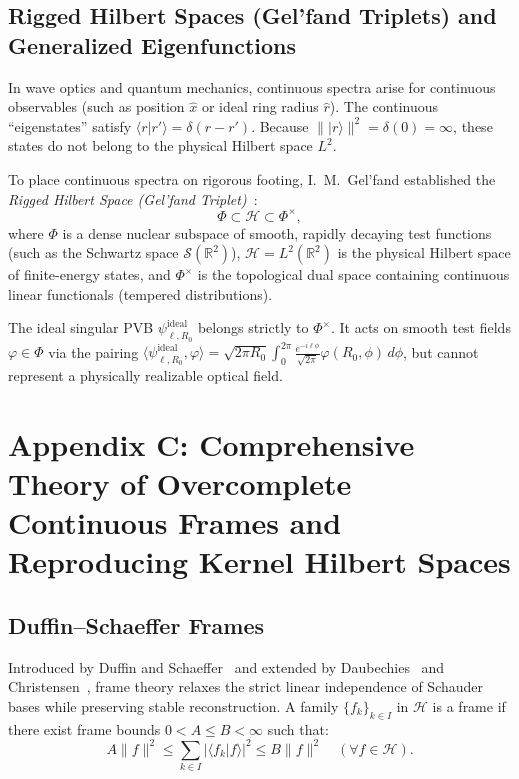 \documentclass[11pt,a4paper]{article}
\begin{document}
\subsection{Rigged Hilbert Spaces (Gel'fand Triplets) and Generalized Eigenfunctions}

In wave optics and quantum mechanics, continuous spectra arise for continuous observables (such as position $\hat{x}$ or ideal ring radius $\hat{r}$). The continuous ``eigenstates'' satisfy $\langle r | r' \rangle = \delta(r - r')$. Because $\||r\rangle\|^2 = \delta(0) = \infty$, these states do not belong to the physical Hilbert space $L^2$.

To place continuous spectra on rigorous footing, I.~M.~Gel'fand established the \emph{Rigged Hilbert Space (Gel'fand Triplet)}~\cite{Gelfand1964,Bohm1989}:
\begin{equation}
\Phi \subset \mathcal{H} \subset \Phi^\times,
\label{eq:app_gelfand_triplet}
\end{equation}
where $\Phi$ is a dense nuclear subspace of smooth, rapidly decaying test functions (such as the Schwartz space $\mathcal{S}(\mathbb{R}^2)$), $\mathcal{H} = L^2(\mathbb{R}^2)$ is the physical Hilbert space of finite-energy states, and $\Phi^\times$ is the topological dual space containing continuous linear functionals (tempered distributions).

The ideal singular PVB $\psi_{\ell, R_0}^{\text{ideal}}$ belongs strictly to $\Phi^\times$. It acts on smooth test fields $\varphi \in \Phi$ via the pairing $\langle \psi_{\ell, R_0}^{\text{ideal}}, \varphi \rangle = \sqrt{2\pi R_0} \int_0^{2\pi} \frac{e^{-i \ell \phi}}{\sqrt{2\pi}} \varphi(R_0, \phi) \, d\phi$, but cannot represent a physically realizable optical field.

\section{Appendix C: Comprehensive Theory of Overcomplete Continuous Frames and Reproducing Kernel Hilbert Spaces}
\label{app:frames}

\subsection{Duffin--Schaeffer Frames}

Introduced by Duffin and Schaeffer~\cite{Duffin1952} and extended by Daubechies~\cite{Daubechies1990} and Christensen~\cite{Christensen2016}, frame theory relaxes the strict linear independence of Schauder bases while preserving stable reconstruction. A family $\{f_k\}_{k \in I}$ in $\mathcal{H}$ is a frame if there exist frame bounds $0 < A \le B < \infty$ such that:
\begin{equation}
A \|f\|^2 \le \sum_{k \in I} |\langle f_k | f \rangle|^2 \le B \|f\|^2 \quad (\forall f \in \mathcal{H}).
\label{eq:app_discrete_frame}
\end{equation}
\end{document}
